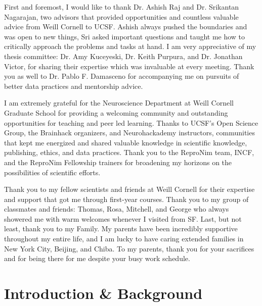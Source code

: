 \documentclass[phd,tocprelim]{cornell}
\begin{document}
\begin{acknowledgements}
First and foremost, I would like to thank Dr. Ashish Raj and Dr. Srikantan Nagarajan, two advisors that provided opportunities and countless valuable advice from Weill Cornell to UCSF. Ashish always pushed the boundaries and was open to new things, Sri asked important questions and taught me how to critically approach the problems and tasks at hand. I am very appreciative of my thesis committee: Dr. Amy Kuceyeski, Dr. Keith Purpura, and Dr. Jonathan Victor, for sharing their expertise which was invaluable at every meeting. Thank you as well to Dr. Pablo F. Damasceno for accompanying me on pursuits of better data practices and mentorship advice.

I am extremely grateful for the Neuroscience Department at Weill Cornell Graduate School for providing a welcoming community and outstanding opportunities for teaching and peer led learning. Thanks to UCSF's Open Science Group, the Brainhack organizers, and Neurohackademy instructors, communities that kept me energized and shared valuable knowledge in scientific knowledge, publishing, ethics, and data practices. Thank you to the ReproNim team, INCF, and the ReproNim Fellowship trainers for broadening my horizons on the possibilities of scientific efforts. 

Thank you to my fellow scientists and friends at Weill Cornell for their expertise and support that got me through first-year courses. Thank you to my group of classmates and friends: Thomas, Rosa, Mitchell, and George who always showered me with warm welcomes whenever I visited from SF. Last, but not least, thank you to my Family. My parents have been incredibly supportive throughout my entire life, and I am lucky to have caring extended families in New York City, Beijing, and Chiba. To my parents, thank you for your sacrifices and for being there for me despite your busy work schedule.
\end{acknowledgements}

\contentspage
\tablelistpage
\figurelistpage

\normalspacing \setcounter{page}{1} 
\pagestyle{cornell} \addtolength{\parskip}{0.5\baselineskip}

\chapter{Introduction \& Background}

\end{document}

